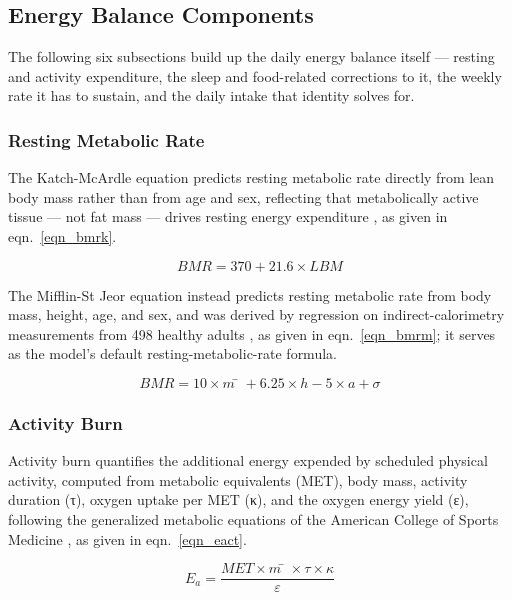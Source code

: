 \subsection{Energy Balance Components}

The following six subsections build up the daily energy balance itself — resting and activity expenditure, the sleep and food-related corrections to it, the weekly rate it has to sustain, and the daily intake that identity solves for.

\subsubsection{Resting Metabolic Rate}

The Katch-McArdle equation predicts resting metabolic rate directly from lean body mass rather than from age and sex, reflecting that metabolically active tissue — not fat mass — drives resting energy expenditure \cite{ref_katch1996}, as given in eqn.~\eqref{eqn_bmrk}.

\begin{equation}
\label{eqn_bmrk}
BMR = 370 + 21.6×LBM
\end{equation}

The Mifflin-St Jeor equation instead predicts resting metabolic rate from body mass, height, age, and sex, and was derived by regression on indirect-calorimetry measurements from 498 healthy adults \cite{ref_mifflin1990}, as given in eqn.~\eqref{eqn_bmrm}; it serves as the model's default resting-metabolic-rate formula.

\begin{equation}
\label{eqn_bmrm}
BMR = 10×m̄ + 6.25×h − 5×a + σ
\end{equation}

\subsubsection{Activity Burn}

Activity burn quantifies the additional energy expended by scheduled physical activity, computed from metabolic equivalents (MET), body mass, activity duration (τ), oxygen uptake per MET (κ), and the oxygen energy yield (ε), following the generalized metabolic equations of the American College of Sports Medicine \cite{ref_acsm2017}, as given in eqn.~\eqref{eqn_eact}.

\begin{equation}
\label{eqn_eact}
E_{a} = \frac{MET × m̄ × τ × κ}{ε}
\end{equation}

